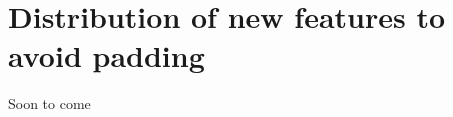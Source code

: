 \documentclass[12pt, a4paper]{book}
\begin{document}
\chapter{Distribution of new features to avoid padding}\label{appendix:no_padding}
Soon to come


\clearpage
\end{document}
